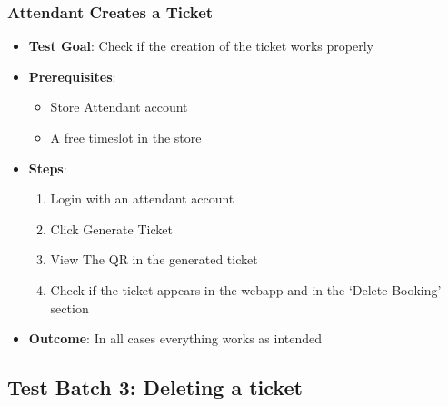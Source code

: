 \subsubsection{Attendant Creates a Ticket}
\begin{itemize}
    \item \textbf{Test Goal}: Check if the creation of the ticket works properly
    \item \textbf{Prerequisites}:
        \begin{itemize}
            \item Store Attendant account
            \item A free timeslot in the store
        \end{itemize}
    \item \textbf{Steps}:
        \begin{enumerate}
            \item Login with an attendant account
            \item Click Generate Ticket
            \item View The QR in the generated ticket
            \item Check if the ticket appears in the webapp and in the `Delete Booking' section
        \end{enumerate}
    \item \textbf{Outcome}: In all cases everything works as intended
\end{itemize}


\subsection{Test Batch 3: Deleting a ticket}
